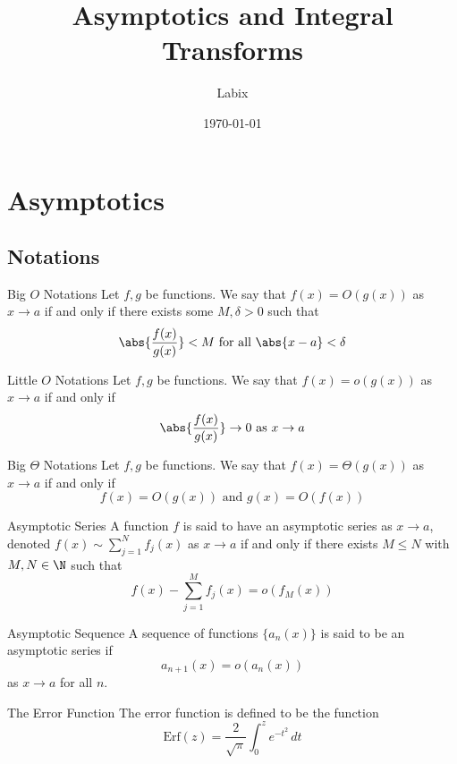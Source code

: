 \documentclass[a4paper]{article}
\title{Asymptotics and Integral Transforms}
\author{Labix}
\date{\today}
\begin{document}
\maketitle
\begin{abstract}
\end{abstract}
\pagebreak
\tableofcontents
\pagebreak

\section{Asymptotics}
\subsection{Notations}
\begin{defn}{Big $O$ Notations}{} Let $f,g$ be functions. We say that $f(x)=O(g(x))$ as $x\to a$ if and only if there exists some $M,\delta>0$ such that $$\abs{\frac{f(x)}{g(x)}}<M \text{ for all } \abs{x-a}<\delta$$
\end{defn}

\begin{defn}{Little $O$ Notations}{} Let $f,g$ be functions. We say that $f(x)=o(g(x))$ as $x\to a$ if and only if $$\abs{\frac{f(x)}{g(x)}}\to 0 \text{ as } x\to a$$
\end{defn}

\begin{defn}{Big $\Theta$ Notations}{} Let $f,g$ be functions. We say that $f(x)=\Theta(g(x))$ as $x\to a$ if and only if $$f(x)=O(g(x))\text{ and }g(x)=O(f(x))$$
\end{defn}

\begin{defn}{Asymptotic Series}{} A function $f$ is said to have an asymptotic series as $x\to a$, denoted $f(x)\sim\sum_{j=1}^Nf_j(x)$ as $x\to a$ if and only if there exists $M\leq N$ with $M,N\in\N$ such that $$f(x)-\sum_{j=1}^Mf_j(x)=o(f_M(x))$$
\end{defn}

\begin{defn}{Asymptotic Sequence}{} A sequence of functions $\{a_n(x)\}$ is said to be an asymptotic series if $$a_{n+1}(x)=o(a_n(x))$$ as $x\to a$ for all $n$. 
\end{defn}

\begin{defn}{The Error Function}{} The error function is defined to be the function $$\text{Erf}(z)=\frac{2}{\sqrt{\pi}}\int_0^ze^{-t^2}\,dt$$
\end{defn}
\end{document}
